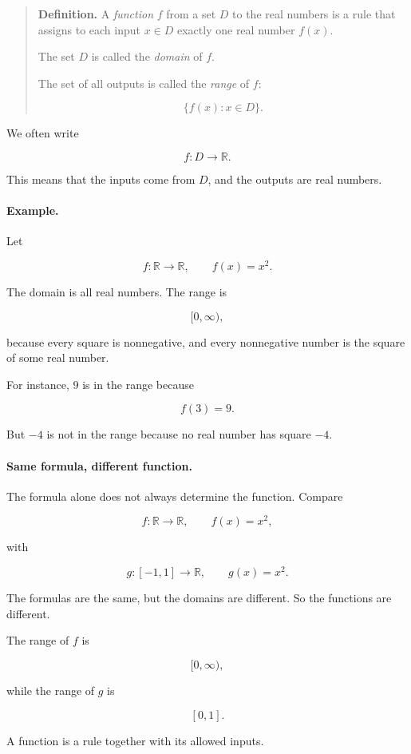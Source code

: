 \begin{quote}
\textbf{Definition.}
A \emph{function} \(f\) from a set \(D\) to the real numbers is a rule that assigns to each input \(x\in D\) exactly one real number \(f(x)\).

The set \(D\) is called the \emph{domain} of \(f\).

The set of all outputs is called the \emph{range} of \(f\):

\[
\{f(x):x\in D\}.
\]
\end{quote}

We often write

\[
f:D\to \mathbb R.
\]

This means that the inputs come from \(D\), and the outputs are real numbers.

\paragraph{Example.}
Let

\[
f:\mathbb R\to \mathbb R,
\qquad
f(x)=x^2.
\]

The domain is all real numbers. The range is

\[
[0,\infty),
\]

because every square is nonnegative, and every nonnegative number is the square of some real number.

For instance, \(9\) is in the range because

\[
f(3)=9.
\]

But \(-4\) is not in the range because no real number has square \(-4\).

\paragraph{Same formula, different function.}
The formula alone does not always determine the function. Compare

\[
f:\mathbb R\to \mathbb R,
\qquad
f(x)=x^2,
\]

with

\[
g:[-1,1]\to \mathbb R,
\qquad
g(x)=x^2.
\]

The formulas are the same, but the domains are different. So the functions are different.

The range of \(f\) is

\[
[0,\infty),
\]

while the range of \(g\) is

\[
[0,1].
\]

A function is a rule together with its allowed inputs.

